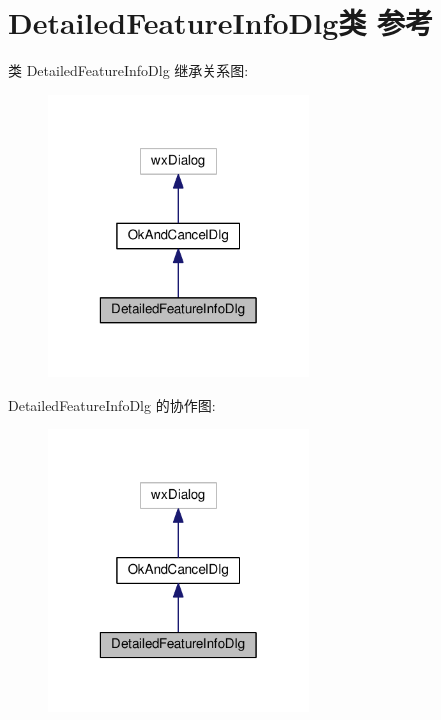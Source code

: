 \hypertarget{class_detailed_feature_info_dlg}{\section{Detailed\+Feature\+Info\+Dlg类 参考}
\label{class_detailed_feature_info_dlg}
}


类 Detailed\+Feature\+Info\+Dlg 继承关系图\+:
\nopagebreak
\begin{figure}[H]
\begin{center}
\leavevmode
\includegraphics[width=196pt]{class_detailed_feature_info_dlg__inherit__graph}
\end{center}
\end{figure}


Detailed\+Feature\+Info\+Dlg 的协作图\+:
\nopagebreak
\begin{figure}[H]
\begin{center}
\leavevmode
\includegraphics[width=196pt]{class_detailed_feature_info_dlg__coll__graph}
\end{center}
\end{figure}
